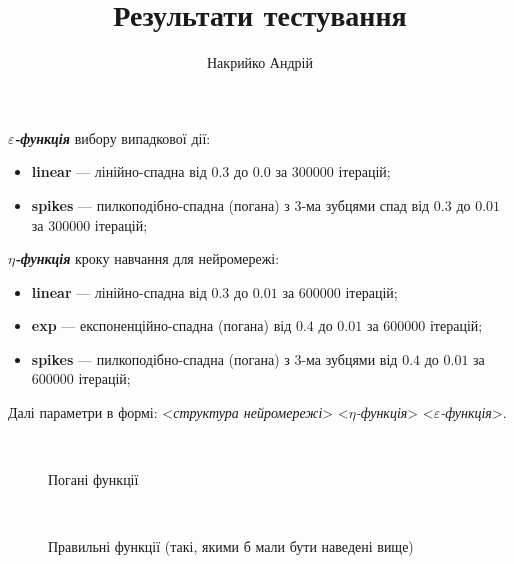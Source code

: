 \documentclass[a4paper,10pt,fleqn]{article}
\title{Результати тестування}
\author{Накрийко Андрій}
\begin{document}
\maketitle

\newpage

\textbf{\textit{$\varepsilon$-функція}} вибору випадкової дії: 
\begin{itemize}
\item \textbf{linear} --- лінійно-спадна від $0.3$ до $0.0$ за 300000 ітерацій;
\item \textbf{spikes} --- пилкоподібно-спадна (погана) з 3-ма зубцями спад від $0.3$ до $0.01$ за 300000 ітерацій;
\end{itemize}

\textbf{\textit{$\eta$-функція}} кроку навчання для нейромережі:
\begin{itemize}
\item \textbf{linear} --- лінійно-спадна від $0.3$ до $0.01$ за 600000 ітерацій;
\item \textbf{exp} ---    експоненційно-спадна (погана) від $0.4$ до $0.01$ за 600000 ітерацій;
\item \textbf{spikes} --- пилкоподібно-спадна (погана) з 3-ма зубцями від $0.4$ до $0.01$ за 600000 ітерацій;
\end{itemize}

Далі параметри в формі: <\textit{структура нейромережі}> <\textit{$\eta$-функція}> <\textit{$\varepsilon$-функція}>.

\vspace*{1.5cm}

\begin{figure}[h]
  \centering
  \,
   \\
  \caption{Погані функції}
\end{figure}

\begin{figure}[h]
  \centering
  \,
   \\
  \caption{Правильні функції (такі, якими б мали бути наведені вище)}
\end{figure}


\newpage
\end{document}
